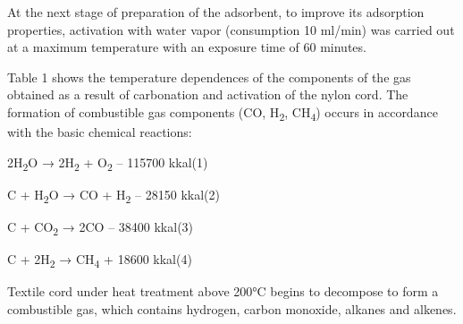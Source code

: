 \begin{multicols}{2}
At the next stage of preparation of the adsorbent, to improve its
adsorption properties, activation with water vapor (consumption 10
ml/min) was carried out at a maximum temperature with an exposure time
of 60 minutes.

Table 1 shows the temperature dependences of the components of the gas
obtained as a result of carbonation and activation of the nylon cord.
The formation of combustible gas components (CO, H\textsubscript{2},
CH\textsubscript{4}) occurs in accordance with the basic chemical
reactions:

2H\textsubscript{2}O → 2H\textsubscript{2} + O\textsubscript{2} --
115700 kkal\hfill (1)

C + H\textsubscript{2}O → CO + H\textsubscript{2} -- 28150 kkal\hfill (2)

C + CO\textsubscript{2} → 2CO -- 38400 kkal\hfill (3)

C + 2H\textsubscript{2} → CH\textsubscript{4} + 18600 kkal\hfill (4)

Textile cord under heat treatment above 200°C begins to decompose to
form a combustible gas, which contains hydrogen, carbon monoxide,
alkanes and alkenes.
\end{multicols}

